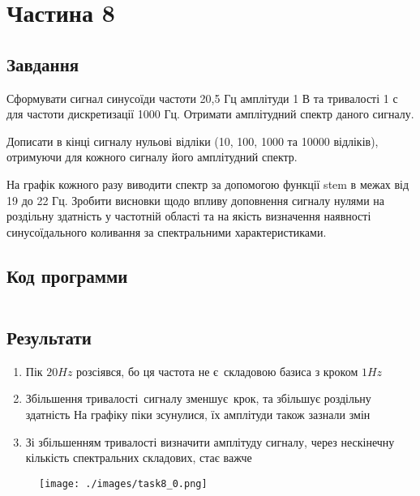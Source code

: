 \section{Частина 8}
\label{sec:task8}

\subsection{Завдання}
\label{subsec:task8_task}

Сформувати сигнал синусоїди частоти 20,5 Гц амплітуди 1 В та
тривалості 1 с для частоти дискретизації 1000 Гц. Отримати амплітудний
спектр даного сигналу.

Дописати в кінці сигналу нульові відліки (10, 100, 1000 та 10000
відліків), отримуючи для кожного сигналу його амплітудний спектр.

На графік кожного разу виводити спектр за допомогою функції stem в
межах від 19 до 22 Гц. Зробити висновки щодо впливу доповнення сигналу
нулями на роздільну здатність у частотній області та на якість визначення
наявності синусоїдального коливання за спектральними характеристиками.

\subsection{Код программи}
\label{subsec:task8_code}
\inputminted{python}{../src/task8.py}

\subsection{Результати}
\label{subsec:task8_results}

\begin{enumerate}
    \item Пік $20 Hz$ розсіявся, бо ця частота не є складовою базиса з кроком $1 Hz$
    \item Збільшення тривалості сигналу зменшує крок, та збільшує роздільну здатність
          На графіку піки зсунулися, їх амплітуди також зазнали змін
    \item Зі збільшенням тривалості визначити амплітуду сигналу, через
          нескінечну кількість спектральних складових, стає важче
\end{enumerate}

\begin{figure}[!ht]
    \centering
    \texttt{[image: ./images/task8\_0.png]}
\end{figure}

